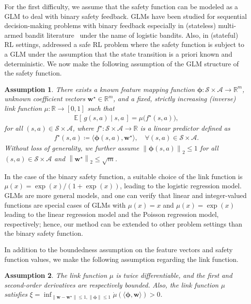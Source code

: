 \documentclass[letterpaper]{article} %
\newtheorem{assumption}{Assumption}
\newcommand{\E}{\mathbb{E}}
\newcommand{\R}{\mathbb{R}}
\newcommand{\cA}{\mathcal{A}}
\newcommand{\cS}{\mathcal{S}}
\newcommand{\bphi}{\bm{\phi}}
\newcommand{\iprod}[2]{\langle #1, #2 \rangle}
\newcommand{\norm}[1]{\left\|{#1}\right\|_2}
\begin{document}
For the first difficulty, we assume that the safety function can be modeled as a GLM to deal with binary safety feedback.
GLMs have been studied for sequential decision-making problems with binary feedback especially in (stateless) multi-armed bandit literature~\citep{filippi2010parametric,li2017provably,faury2020improved} under the name of logistic bandits.
Also, in (stateful) RL settings, \citet{wachi2021safe} addressed a safe RL problem where the safety function is subject to a GLM under the assumption that the state transition is a priori known and deterministic.
We now make the following assumption of the GLM structure of the safety function.
%
\begin{assumption}
\label{assumption:linear}
There exists a known feature mapping function $\bphi: \cS \times \cA \rightarrow \R^m$, unknown coefficient vectors $\bm{w}^\star \in \R^m$, and a fixed, strictly increasing (inverse) link function $\mu: \R \rightarrow [0, 1]$ such that
%
\begin{align}
\label{eq:gl_safety}  
    \E[\, g(s, a) \mid s, a \,] = \mu\bigl(f^\star(s,a)\bigr),
\end{align}
%
for all $(s, a) \in \cS \times \cA$,
where $f^\star: \cS \times \cA \rightarrow \R$ is a linear predictor defined as
%
\begin{align}
    f^\star(s, a) \coloneqq \iprod{\bphi(s,a)}{\bm{w}^\star}, \quad \forall (s, a) \in \cS \times \cA. 
\end{align}
%
Without loss of generality, we further assume $\norm{\bphi(s, a)} \le 1$ for all $(s,a) \in \cS \times \cA$ and $\norm{\bm{w}^\star} \le \sqrt{m}$.
\end{assumption}
%
\noindent
In the case of the binary safety function, a suitable choice of the link function is $\mu(x) = \exp(x)/(1 + \exp(x))$, leading to the logistic regression model.
GLMs are more general models, and one can verify that linear and integer-valued functions are special cases of GLMs with $\mu(x) = x$ and $\mu(x) = \exp(x)$ leading to the linear regression model and the Poisson regression model, respectively; hence, our method can be extended to other problem settings than the binary safety function.

In addition to the boundedness assumption on the feature vectors and safety function values, we make the following assumption regarding the link function.
%
\begin{assumption}
\label{assumption:link}
The link function $\mu$ is twice differentiable, and the first and second-order derivatives are respectively bounded.
Also, the link function $\mu$ satisfies $\xi = \inf_{\| \bm{w} - \bm{w}^\star \| \le 1, \|\bm{\phi}\| \le 1} \dot{\mu}(\iprod{\bm{\phi}} {\bm{w}}) > 0$.
\end{assumption}
\end{document}
